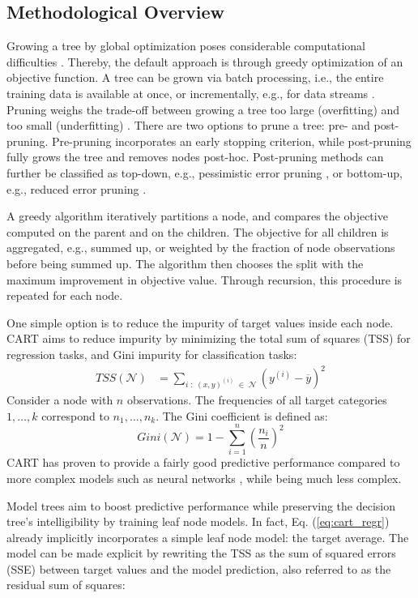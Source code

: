 \documentclass[a4paper, 11pt]{article}
\newcommand{\Node}{\mathcal{N}}
\begin{document}
\subsection{Methodological Overview}

Growing a tree by global optimization poses considerable computational difficulties \cite{norouzi_nongreedy_tree}. Thereby, the default approach is through greedy optimization of an objective function. A tree can be grown via batch processing, i.e., the entire training data is available at once, or incrementally, e.g., for data streams \cite{potts_incremental_model_tree}. Pruning weighs the trade-off between growing a tree too large (overfitting) and too small (underfitting) \cite{hastie_elemstatlearn}. There are two options to prune a tree: pre- and post-pruning. Pre-pruning incorporates an early stopping criterion, while post-pruning fully grows the tree and removes nodes post-hoc. Post-pruning methods can further be classified as top-down, e.g., pessimistic error pruning \cite{quinlan_simplifying}, or bottom-up, e.g., reduced error pruning \cite{quinlan_simplifying}.
\par
A greedy algorithm iteratively partitions a node, and compares the objective computed on the parent and on the children. The objective for all children is aggregated, e.g., summed up, or weighted by the fraction of node observations before being summed up. The algorithm then chooses the split with the maximum improvement in objective value. Through recursion, this procedure is repeated for each node.
\par 
One simple option is to reduce the impurity of target values inside each node. CART aims to reduce impurity by minimizing the total sum of squares (TSS) for regression tasks, and Gini impurity for classification tasks:
\begin{align}
TSS(\Node) &= \sum_{i \;:\; (x, y)^{(i)} \;\in\; \Node} \left(y^{(i)} - \overline{y}\right)^2
\label{eq:cart_regr}
\end{align}
Consider a node with $n$ observations. The frequencies of all target categories $1, \dots, k$ correspond to $n_1, \dots, n_k$. The Gini coefficient is defined as:
$$
Gini(\Node) = 1 - \sum_{i = 1}^n \left(\frac{n_i}{n}\right)^2
$$
CART has proven to provide a fairly good predictive performance compared to more complex models such as neural networks \cite{razi_cart_comparison}, while being much less complex.
\par
Model trees aim to boost predictive performance while preserving the decision tree's intelligibility by training leaf node models. In fact, Eq. (\ref{eq:cart_regr}) already implicitly incorporates a simple leaf node model: the target average. The model can be made explicit by rewriting the TSS as the sum of squared errors (SSE) between target values and the model prediction, also referred to as the residual sum of squares:
\end{document}
